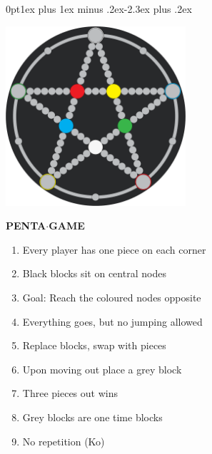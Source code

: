 \titlespacing*{\section}
{0pt}{1ex plus 1ex minus .2ex}{-2.3ex plus .2ex}
\newcommand{\skipper}{\medskip\hrulefill\section{}}

  
        \centering
        \includegraphics[width=0.5\textwidth]{Pentagame_board_2018.png}
        
        \vspace{6ex}
        
        {\sffamily\Large\textbf{PENTA$\cdot$GAME}}
        
        \bigskip

    \begin{enumerate}
    \centering
        \item Every player has one piece on each corner
        \item Black blocks sit on central nodes
        \item Goal: Reach the coloured nodes opposite
        \item Everything goes, but no jumping allowed
        \item Replace blocks, swap with pieces
        \item Upon moving out place a grey block
        \item Three pieces out wins
        \item Grey blocks are one time blocks
        \item No repetition (Ko)
    \end{enumerate}
    
\newpage



